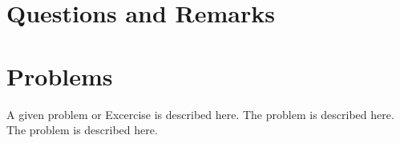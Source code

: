 \section{Questions and Remarks}
\label{sec:QR2}






%
%
%


\section*{Problems}
%
\begin{prob}
\label{prob1}
A given problem or Excercise is described here. The
problem is described here. The problem is described here.
\end{prob}



